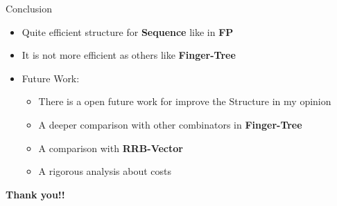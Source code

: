 \documentclass{beamer}
\begin{document}
\begin{frame}[fragile]{Conclusion}

    \begin{itemize}
      \item Quite efficient structure for \textbf{Sequence} like in \textbf{FP}
      \item It is not more efficient as others like \textbf{Finger-Tree}
      \item Future Work:
        \begin{itemize}
            \item There is a open future work for improve the Structure in my opinion
            \item A deeper comparison with other combinators in \textbf{Finger-Tree}
            \item A comparison with \textbf{RRB-Vector}
            \item A rigorous analysis about costs
        \end{itemize}
    \end{itemize}

\end{frame}


\begin{frame}
  \begin{center}
    \textbf{\huge{Thank you!!}}
    \end{center}
\end{frame}
\end{document}

